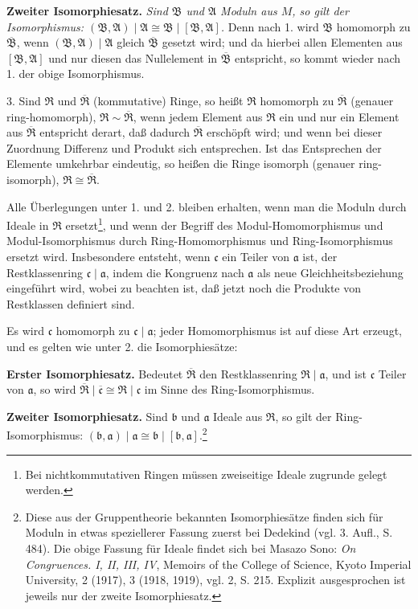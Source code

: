 \documentclass[11pt]{article}
\providecommand{\mR}{\mathfrak{R}}
\providecommand{\mA}{\mathfrak{A}}
\providecommand{\mB}{\mathfrak{B}}
\providecommand{\ma}{\mathfrak{a}}
\providecommand{\mb}{\mathfrak{b}}
\providecommand{\mc}{\mathfrak{c}}
\begin{document}
\textbf{Zweiter Isomorphiesatz.} \emph{Sind $\mB$ und $\mA$ Moduln aus $M$, so gilt der Isomorphismus: $(\mB,\mA)\mid\mA\cong \mB\mid[\mB,\mA]$.} Denn nach 1. wird $\mB$ homomorph zu $\overline{\mB}$, wenn $(\mB,\mA)\mid\mA$ gleich $\overline{\mB}$ gesetzt wird; und da hierbei allen Elementen aus $[\mB,\mA]$ und nur diesen das Nullelement in $\overline{\mB}$ entspricht, so kommt wieder nach 1. der obige Isomorphismus.

3. Sind $\mR$ und $\overline{\mR}$ (kommutative) Ringe, so heißt $\mR$ homomorph zu $\overline{\mR}$ (genauer ring-homomorph), $\mR\sim\overline{\mR}$, wenn jedem Element aus $\mR$ ein und nur ein Element aus $\overline{\mR}$ entspricht derart, daß dadurch $\overline{\mR}$ erschöpft wird; und wenn bei dieser Zuordnung Differenz und Produkt sich entsprechen. Ist das Entsprechen der Elemente umkehrbar eindeutig, so heißen die Ringe isomorph (genauer ring-isomorph), $\mR\cong\overline{\mR}$.

Alle Überlegungen unter 1. und 2. bleiben erhalten, wenn man die Moduln durch Ideale in $\mR$ ersetzt\footnote{Bei nichtkommutativen Ringen müssen zweiseitige Ideale zugrunde gelegt werden.}, und wenn der Begriff des Modul-Homomorphismus und Modul-Isomorphismus durch Ring-Homomorphismus und Ring-Isomorphismus ersetzt wird. Insbesondere entsteht, wenn $\mc$ ein Teiler von $\ma$ ist, der Restklassenring $\mc\mid\ma$, indem die Kongruenz nach $\ma$ als neue Gleichheitsbeziehung eingeführt wird, wobei zu beachten ist, daß jetzt noch die Produkte von Restklassen definiert sind.

Es wird $\mc$ homomorph zu $\mc\mid\ma$; jeder Homomorphismus ist auf diese Art erzeugt, und es gelten wie unter 2. die Isomorphiesätze:

\textbf{Erster Isomorphiesatz.} Bedeutet $\overline{\mR}$ den Restklassenring $\mR\mid\ma$, und ist $\mc$ Teiler von $\ma$, so wird $\overline{\mR}\mid\overline{\mc}\cong\mR\mid\mc$ im Sinne des Ring-Isomorphismus.

\textbf{Zweiter Isomorphiesatz.} Sind $\mb$ und $\ma$ Ideale aus $\mR$, so gilt der Ring-Isomorphismus: $(\mb,\ma)\mid\ma\cong\mb\mid[\mb,\ma]$.\footnote{Diese aus der Gruppentheorie bekannten Isomorphiesätze finden sich für Moduln in etwas speziellerer Fassung zuerst bei Dedekind (vgl. 3. Aufl., S. 484). Die obige Fassung für Ideale findet sich bei Masazo Sono: \emph{On Congruences. I, II, III, IV}, Memoirs of the College of Science, Kyoto Imperial University, 2 (1917), 3 (1918, 1919), vgl. 2, S. 215. Explizit ausgesprochen ist jeweils nur der zweite Isomorphiesatz.}
\end{document}
